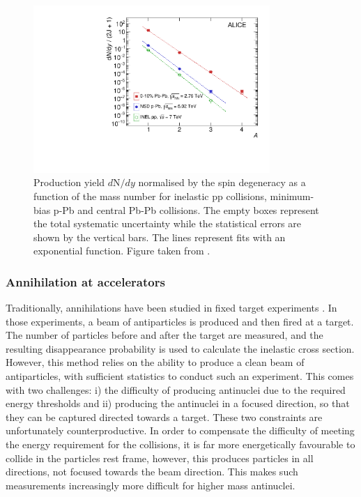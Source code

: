 \begin{figure}[h!]
    \centering
    \includegraphics[width=0.8\textwidth]{figures/PenaltyFactor-97548.pdf}
    \caption{Production yield $d\mathrm{N}/dy$  normalised by the spin degeneracy as a function of the mass number for inelastic pp collisions, minimum-bias p-Pb and central Pb-Pb collisions. The empty boxes represent the total systematic uncertainty while the statistical errors are shown by the vertical bars. The lines represent fits with an exponential function. Figure taken from \cite{antinuclei_mult_dependence}.  }
    \label{fig:PenaltyFactorNuclei}
\end{figure}



\subsubsection{Annihilation at accelerators}
Traditionally, annihilations have been studied in fixed target experiments \cite{Binon:1970yu, Denisov:1971im, pbar_data}. In those experiments, a beam of antiparticles is produced and then fired at a target. The number of particles before and after the target are measured, and the resulting disappearance probability is used to calculate the inelastic cross section. However, this method relies on the ability to produce a clean beam of antiparticles, with sufficient statistics to conduct such an experiment. This comes with two challenges: i) the difficulty of producing antinuclei due to the required energy thresholds and ii) producing the antinuclei in a focused direction, so that they can be captured directed towards a target. These two constraints are unfortunately counterproductive. In order to compensate the difficulty of meeting the energy requirement for the collisions, it is far more energetically favourable to collide in the particles rest frame, however, this produces particles in all directions, not focused towards the beam direction. This makes such measurements increasingly more difficult for higher mass antinuclei.\\

